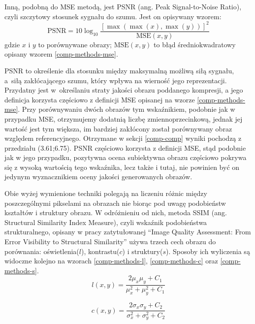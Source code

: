         Inną, podobną do MSE metodą, jest PSNR (ang. Peak Signal-to-Noise Ratio), czyli szczytowy stosunek sygnału do szumu. Jest on opisywany wzorem:
        \begin{equation} \label{comp-methods-psnr}
           \mathrm{PSNR} = 10\log_{10} \frac{[\max(\max(x),\max(y))]^2}{\mathrm{MSE}(x,y)}
        \end{equation}
        gdzie \(x\) i \(y\) to porównywane obrazy; \(\mathrm{MSE}(x,y)\) to błąd średniokwadratowy opisany wzorem \ref{comp-methods-mse}.
        
        PSNR to określenie dla stosunku między maksymalną możliwą siłą sygnału, a~siłą zakłócającego szumu, który wpływa na wierność jego reprezentacji. Przydatny jest w~określaniu straty jakości obrazu poddanego kompresji, a jego definicja korzysta częściowo z definicji MSE opisanej na wzorze \ref{comp-methods-mse}. Przy porównywaniu dwóch obrazów tym wskaźnikiem, podobnie jak w przypadku MSE, otrzymujemy dodatnią liczbę zmiennoprzecinkową, jednak jej wartość jest tym większa, im bardziej zakłócony został porównywany obraz względem referencyjnego. Otrzymane w sekcji \ref{comp-comp} wyniki pochodzą z przedziału (3.61;6.75). PSNR częściowo korzysta z definicji MSE, stąd podobnie jak w jego przypadku, pozytywna ocena subiektywna obrazu częściowo pokrywa się z wysoką wartością tego wskaźnika, lecz także i tutaj, nie powinien być on jedynym wyznacznikiem oceny jakości generowanych obrazów.
        
        Obie wyżej wymienione techniki polegają na liczeniu różnic między poszczególnymi pikselami na obrazach nie biorąc pod uwagę podobieństw kształtów i struktury obrazu. W odróżnieniu od nich, metoda SSIM (ang. Structural Similarity Index Measure), czyli wskaźnik podobieństwa strukturalnego, opisany w pracy zatytułowanej ``Image Quality Assessment: From Error Visibility to Structural Similarity'' \cite{ssim} używa trzech cech obrazu do porównania: oświetlenia(\(l\)), kontrastu(\(c\)) i struktury(\(s\)). Sposoby ich wyliczenia są widoczne kolejno na wzorach \ref{comp-methods-l}, \ref{comp-methods-c} oraz \ref{comp-methods-s}. 
        \begin{equation} \label{comp-methods-l}
           l(x,y)=\frac{2\mu_x	\mu_y + C_1}{\mu_x^2 + \mu_y^2 + C_1}
        \end{equation}
        
        \begin{equation} \label{comp-methods-c}
           c(x,y)=\frac{2\sigma_x	\sigma_y + C_2}{\sigma_x^2 + \sigma_y^2 + C_2}
        \end{equation}
        
